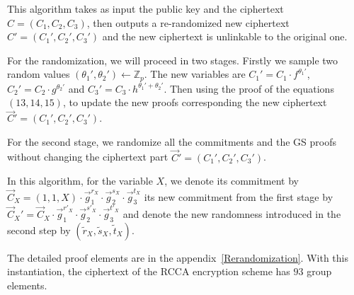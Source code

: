 This algorithm takes as input the public key and the ciphertext $C = (C_1, C_2, C_3)$, then outputs a re-randomized new ciphertext $C' = (C_1', C_2', C_3')$ and the new ciphertext is unlinkable to the original one.

For the randomization, we will proceed in two stages. Firstly we sample two random values $(\theta_1', \theta_2') \gets \mathbb{Z}_p$. The new variables are $C_1' = C_1 \cdot f^{\theta_1'}$, $C_2' = C_2 \cdot g^{\theta_2'}$ and $C_3' = C_3 \cdot h^{\theta_1'+\theta_2'}$. Then using the proof of the equations $(13, 14, 15)$, to update the new proofs corresponding the new ciphertext $\vec{C}' = (C_1', C_2', C_3')$.


For the second stage, we randomize all the commitments and the GS proofs without changing the ciphertext part $\vec{C}' = (C_1', C_2', C_3')$.

In this algorithm, for the variable $X$, we denote its commitment by $\vec{C}_X = (1, 1, X) \cdot \vec{g}_1^{r_X} \cdot \vec{g}_2^{s_X} \cdot \vec{g}_3^{t_X}$ its new commitment from the first stage by $\vec{C}_X' = \vec{C}_X \cdot \vec{g}_1^{r'_X} \cdot \vec{g}_2^{s'_X} \cdot \vec{g}_3^{t'_X}$ and denote the new randomness introduced in the second step by $(\tilde{r}_X, \tilde{s}_X, \tilde{t}_X)$.


The detailed proof elements are in the appendix~\ref{Rerandomization}. With this instantiation, the ciphertext of the RCCA encryption scheme has $93$ group elements.
